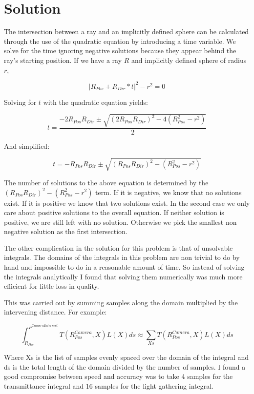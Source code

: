\documentclass[12pt, letterpaper]{article}
\begin{document}
\section{Solution}

The intersection between a ray and an implicitly defined sphere can be
calculated through the use of the quadratic equation by introducing a time
variable. We solve for the time ignoring negative solutions because they appear
behind the ray's starting position. If we have a ray $R$ and implicitly defined
sphere of radius $r$,

\[
  |R_{Pos} + R_{Dir}*t|^2 - r^2 = 0
\]

Solving for $t$ with the quadratic equation yields:

\[
  t = \frac{-2R_{Pos}R_{Dir} \pm \sqrt{(2R_{Pos}R_{Dir})^2-4(R_{Pos}^2-r^2)}}{2}
\]

And simplified:

\[
  t = -R_{Pos}R_{Dir} \pm \sqrt{(R_{Pos}R_{Dir})^2-(R_{Pos}^2-r^2)}
\]

The number of solutions to the above equation is determined by the
$(R_{Pos}R_{Dir})^2-(R_{Pos}^2-r^2)$ term. If it is negative, we know that no
solutions exist. If it is positive we know that two solutions exist. In the
second case we only care about positive solutions to the overall equation. If
neither solution is positive, we are still left with no solution. Otherwise we
pick the smallest non negative solution as the first intersection.

The other complication in the solution for this problem is that of unsolvable
integrals. The domains of the integrals in this problem are non trivial to do by
hand and impossible to do in a reasonable amount of time. So instead of solving
the integrals analytically I found that solving them numerically was much more
efficient for little loss in quality.

This was carried out by summing samples along the domain multiplied by the
intervening distance. For example:

\[
  \int_{R_{Pos}}^{P^{CameraIntersect}}T(R^{Camera}_{Pos}, X)L(X)ds \approx \sum_{Xs}T(R^{Camera}_{Pos}, X)L(X)ds
\]

Where Xs is the list of samples evenly spaced over the domain of the integral
and ds is the total length of the domain divided by the number of samples. I
found a good compromise between speed and accuracy was to take 4 samples for the
transmittance integral and 16 samples for the light gathering integral.
\end{document}
